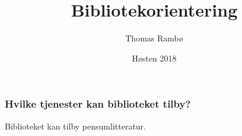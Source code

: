 \documentclass{beamer}
\title{Bibliotekorientering}
\author{Thomas Rambø\inst{1}}
\institute[DMMH-biblioteket]{
  \inst{1}
  Biblioteket\\
  Dronning Mauds Minne Høgskole
}
\date{Høsten 2018}
\begin{document}
\frame{\titlepage}

\begin{frame}
  \frametitle{Hvilke tjenester kan biblioteket tilby?}
  Biblioteket kan tilby pensumlitteratur.
\end{frame}
\end{document}
